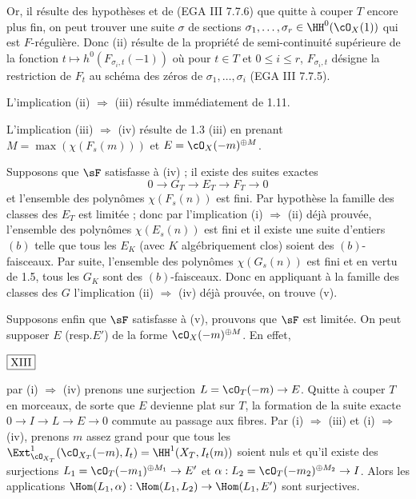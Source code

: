 Or, il résulte des hypothèses et de (EGA III 7.7.6) que quitte à couper $T$ encore plus fin, on peut trouver une suite $\sigma$ de sections $\sigma_1, \ldots, \sigma_r \in \HH^0(\cO_X(1))$ qui est $F$-régulière. Donc (ii) résulte de la propriété de semi-continuité supérieure de la fonction $t \mapsto h^0(F_{\sigma_i,t}(-1))$ où pour $t \in T$ et $0 \leq i \leq r$, $F_{\sigma_i,t}$ désigne la restriction de $F_t$ au schéma des zéros de $\sigma_1, \ldots, \sigma_i$ (EGA III 7.7.5).

L'implication (ii) $\Rightarrow$ (iii) résulte immédiatement de 1.11.

L'implication (iii) $\Rightarrow$ (iv) résulte de 1.3 (iii) en prenant $M = \max(\chi(F_s(m)))$ et $E = \cO_X(-m)^{\oplus M}$.

Supposons que $\sF$ satisfasse à (iv) ; il existe des suites exactes
\[
0 \to G_T \to E_T \to F_T \to 0
\]
et l'ensemble des polynômes $\chi(F_s(n))$ est fini. Par hypothèse la famille des classes des $E_T$ est limitée ; donc par l'implication (i) $\Rightarrow$ (ii) déjà prouvée, l'ensemble des polynômes $\chi(E_s(n))$ est fini et il existe une suite d'entiers $(b)$ telle que tous les $E_K$ (avec $K$ algébriquement clos) soient des $(b)$-faisceaux. Par suite, l'ensemble des polynômes $\chi(G_s(n))$ est fini et en vertu de 1.5, tous les $G_K$ sont des $(b)$-faisceaux. Donc en appliquant à la famille des classes des $G$ l'implication (ii) $\Rightarrow$ (iv) déjà prouvée, on trouve (v).

Supposons enfin que $\sF$ satisfasse à (v), prouvons que $\sF$ est limitée. On peut supposer $E$ (resp.\@ $E'$) de la forme $\cO_X(-m)^{\oplus M}$. En effet,

\begin{flushright}
$\fbox{\text{XIII}}$
\end{flushright}

\noindent
par (i) $\Rightarrow$ (iv) prenons une surjection $L = \cO_T(-m) \to E$. Quitte à couper $T$ en morceaux, de sorte que $E$ devienne plat sur $T$, la formation de la suite exacte $0 \to I \to L \to E \to 0$ commute au passage aux fibres. Par (i) $\Rightarrow$ (iii) et (i) $\Rightarrow$ (iv), prenons $m$ assez grand pour que tous les $\Ext^1_{\cO_{X_T}}(\cO_{X_T}(-m), I_t) = \HH^1(X_T, I_t(m))$ soient nuls et qu'il existe des surjections $L_1 = \cO_T(-m_1)^{\oplus M_1} \to E'$ et $\alpha : L_2 = \cO_T(-m_2)^{\oplus M_2} \to I$. Alors les applications $\Hom(L_1, \alpha) : \Hom(L_1, L_2) \to \Hom(L_1, E')$ sont surjectives.

